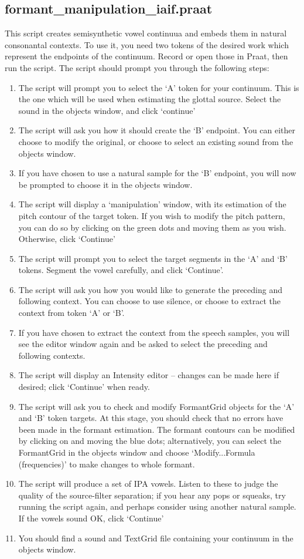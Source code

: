 \documentclass{article}\usepackage[]{graphicx}\usepackage[]{color}
\begin{document}
\subsection*{formant\_manipulation\_iaif.praat}
This script creates semisynthetic vowel continuua and embeds them in natural consonantal contexts. To use it, you need two tokens of the desired work which represent the endpoints of the continuum. Record or open those in Praat, then run the script. The script should prompt you through the following steps:
\begin{enumerate}
\item{The script will prompt you to select the `A' token for your continuum. This is the one which will be used when estimating the glottal source. Select the sound in the objects window, and click `continue'}
\item{The script will ask you how it should create the `B' endpoint. You can either choose to modify the original, or choose to select an existing sound from the objects window.}
\item{If you have chosen to use a natural sample for the `B' endpoint, you will now be prompted to choose it in the objects window.}
\item{The script will display a `manipulation' window, with its estimation of the pitch contour of the target token. If you wish to modify the pitch pattern, you can do so by clicking on the green dots and moving them as you wish. Otherwise, click `Continue'}
\item{The script will prompt you to select the target segments in the `A' and `B' tokens. Segment the vowel carefully, and click `Continue'.}
\item{The script will ask you how you would like to generate the preceding and following context. You can choose to use silence, or choose to extract the context from token `A' or `B'.}
\item{If you have chosen to extract the context from the speech samples, you will see the editor window again and be asked to select the preceding and following contexts.}
\item{The script will display an Intensity editor -- changes can be made here if desired; click `Continue' when ready.}
\item{The script will ask you to check and modify FormantGrid objects for the `A' and `B' token targets. At this stage, you should check that no errors have been made in the formant estimation. The formant contours can be modified by clicking on and moving the blue dots; alternatively, you can select the FormantGrid in the objects window and choose `Modify...Formula (frequencies)' to make changes to whole formant.}
\item{The script will produce a set of IPA vowels. Listen to these to judge the quality of the source-filter separation; if you hear any pops or squeaks, try running the script again, and perhaps consider using another natural sample. If the vowels sound OK, click `Continue'}
\item{You should find a sound and TextGrid file containing your continuum in the objects window.}
\end{enumerate}
\end{document}
